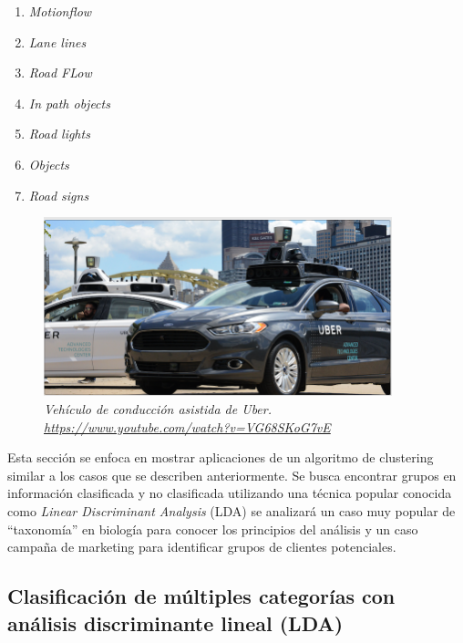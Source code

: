 \documentclass[letterpaper,12pt, spanish, oneside]{book} %
\begin{document}
\begin{enumerate}
\item \textit{Motionflow}
\item \textit{Lane lines}
\item\textit{Road FLow}
\item \textit{In path objects}
\item \textit{Road lights}
\item \textit{Objects}
\item \textit{Road signs}
\end{enumerate}

\begin{figure}[H]
\centering
\includegraphics[width=0.9\textwidth]{uber1.png}
\caption{\label{fig:frog2}\textit{Vehículo de conducción asistida de Uber. \url{https://www.youtube.com/watch?v=VG68SKoG7vE}}}
\end{figure}

Esta sección se enfoca en mostrar aplicaciones de un algoritmo de clustering similar a los casos que se describen anteriormente. Se busca encontrar grupos en información clasificada y no clasificada utilizando una técnica popular conocida como \textit{Linear Discriminant Analysis} (LDA) se analizará un caso muy popular de “taxonomía” en biología para conocer los principios del análisis y un caso campaña de marketing para identificar grupos de clientes potenciales.

\subsection{Clasificación de múltiples categorías con análisis discriminante lineal (LDA)}
\end{document}
